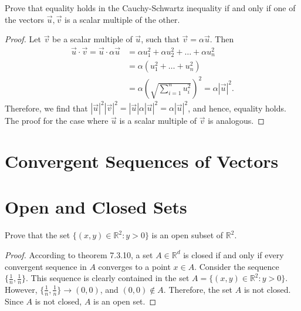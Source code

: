 \documentclass[12pt]{book}
\newcommand{\R}{\mathbb{R}}
\newenvironment{exercise}[2][Exercise]{\begin{trivlist}
\item[\hskip \labelsep {\bfseries #1}\hskip \labelsep {\bfseries #2.}]}{\end{trivlist}}
\begin{document}
\begin{exercise}{7.1.6}
Prove that equality holds in the Cauchy-Schwartz inequality if and only if one of the vectors $\vec{u}, \vec{v}$ is a scalar multiple of the other.
    
    \begin{proof}
    Let $\vec{v}$ be a scalar multiple of $\vec{u}$, such that $\vec{v} = \alpha \vec{u}$. Then 
        \begin{align*}
        \vec{u} \cdot \vec{v} = \vec{u} \cdot \alpha \vec{u} &= \alpha u_1^2 + \alpha u_2^2 + \hdots + \alpha u_n^2 \\
         &= \alpha \left( u_1^2 + \hdots + u_n^2 \right) \\
         &= \alpha \left( \sqrt{ \sum_{i=1}^n u_i^2 } \right)^2 = \alpha \left| \vec{u} \right| ^2.
        \end{align*}
    Therefore, we find that $\left| \vec{u} \right|^2 \left|\vec{v}\right|^2 = \left|\vec{u}\right| \alpha \left|\vec{u}\right|^2= \alpha \left| \vec{u} \right|^2$, and hence, equality holds. The proof for the case where $\vec{u}$ is a scalar multiple of $\vec{v}$ is analogous.
    \end{proof}
\end{exercise} 



\section{Convergent Sequences of Vectors}





\section{Open and Closed Sets}


\begin{exercise}{7.3.1}
Prove that the set $\{(x, y) \in \R^2 : y > 0\}$ is an open subset of $\R^2$. 

    \begin{proof}
    According to theorem 7.3.10, a set $A\in \R^d$ is closed if and only if every convergent sequence in $A$ converges to a point $x \in A$. Consider the sequence $\{\frac{1}{n}, \frac{1}{n} \}$. This sequence is clearly contained in the set $A = \{(x, y) \in \R^2 : y > 0\}$. However, $\{\frac{1}{n}, \frac{1}{n} \} \to (0,0)$, and $(0,0) \notin A$. Therefore, the set $A$ is not closed. Since $A$ is not closed, $A$ is an open set.
    \end{proof}
\end{exercise}
\end{document}
